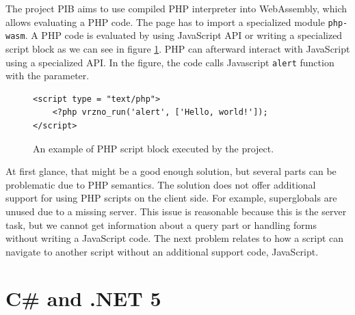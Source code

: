 The project PIB \cite{online:pib} aims to use compiled PHP interpreter into WebAssembly, which allows evaluating a PHP code.
The page has to import a specialized module \texttt{php-wasm}. 
A PHP code is evaluated by using JavaScript API or writing a specialized script block as we can see in figure \ref{img03:vrzno}.
PHP can afterward interact with JavaScript using a specialized API.
In the figure, the code calls Javascript \texttt{alert} function with the parameter.
\par
\begin{figure}[b!]
\begin{lstlisting}
<script type = "text/php">
	<?php vrzno_run('alert', ['Hello, world!']);
</script>
\end{lstlisting}
\caption{An example of PHP script block executed by the project.}
\label{img03:vrzno}
\end{figure}
\par
At first glance, that might be a good enough solution, but several parts can be problematic due to PHP semantics.
The solution does not offer additional support for using PHP scripts on the client side.
For example, superglobals are unused due to a missing server.
This issue is reasonable because this is the server task, but we cannot get information about a query part or handling forms without writing a JavaScript code.
The next problem relates to how a script can navigate to another script without an additional support code, JavaScript.

\section{C\# and .NET 5}


